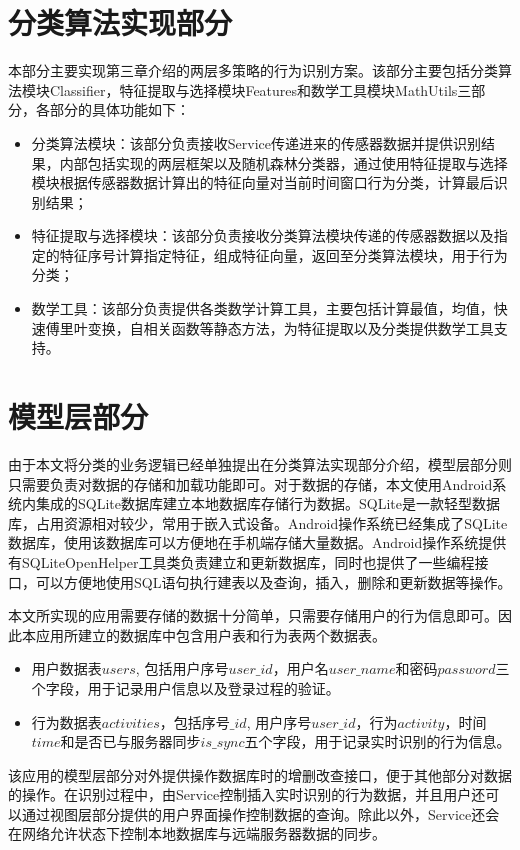 \section{分类算法实现部分}
\par 本部分主要实现第三章介绍的两层多策略的行为识别方案。该部分主要包括分类算法模块Classifier，特征提取与选择模块Features和数学工具模块MathUtils三部分，各部分的具体功能如下：
\begin{itemize}
	\item 分类算法模块：该部分负责接收Service传递进来的传感器数据并提供识别结果，内部包括实现的两层框架以及随机森林分类器，通过使用特征提取与选择模块根据传感器数据计算出的特征向量对当前时间窗口行为分类，计算最后识别结果；
	\item 特征提取与选择模块：该部分负责接收分类算法模块传递的传感器数据以及指定的特征序号计算指定特征，组成特征向量，返回至分类算法模块，用于行为分类；
	\item 数学工具：该部分负责提供各类数学计算工具，主要包括计算最值，均值，快速傅里叶变换，自相关函数等静态方法，为特征提取以及分类提供数学工具支持。
\end{itemize}
\section{模型层部分}
\par 由于本文将分类的业务逻辑已经单独提出在分类算法实现部分介绍，模型层部分则只需要负责对数据的存储和加载功能即可。对于数据的存储，本文使用Android系统内集成的SQLite数据库建立本地数据库存储行为数据。SQLite是一款轻型数据库，占用资源相对较少，常用于嵌入式设备。Android操作系统已经集成了SQLite数据库，使用该数据库可以方便地在手机端存储大量数据。Android操作系统提供有SQLiteOpenHelper工具类负责建立和更新数据库，同时也提供了一些编程接口，可以方便地使用SQL语句执行建表以及查询，插入，删除和更新数据等操作。
\par 本文所实现的应用需要存储的数据十分简单，只需要存储用户的行为信息即可。因此本应用所建立的数据库中包含用户表和行为表两个数据表。
\begin{itemize}
	\item 用户数据表$users$, 包括用户序号$user\_id$，用户名$user\_name$和密码$password$三个字段，用于记录用户信息以及登录过程的验证。
	\item 行为数据表$activities$，包括序号$\_id$, 用户序号$user\_id$，行为$activity$，时间$time$和是否已与服务器同步$is\_sync$五个字段，用于记录实时识别的行为信息。
\end{itemize}
\par 该应用的模型层部分对外提供操作数据库时的增删改查接口，便于其他部分对数据的操作。在识别过程中，由Service控制插入实时识别的行为数据，并且用户还可以通过视图层部分提供的用户界面操作控制数据的查询。除此以外，Service还会在网络允许状态下控制本地数据库与远端服务器数据的同步。

